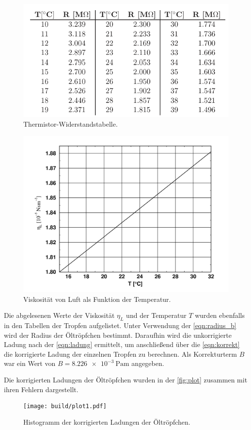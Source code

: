 \begin{figure}[H]
    \centering
	\includegraphics[width=0.666\linewidth]{content/grafik/widerstand.png}
	\captionsetup{width=0.925\linewidth}
	\caption{Thermistor-Widerstandstabelle. \cite{millikan}}
	\label{fig:wider}
\end{figure}

\begin{figure}[H]
    \centering
	\includegraphics[width=0.666\linewidth]{content/grafik/graph.png}
	\captionsetup{width=0.925\linewidth}
	\caption{Viskosität von Luft als Funktion der Temperatur. \cite{millikan}}
	\label{fig:graph}
\end{figure}

Die abgelesenen Werte der Viskosität $\eta_L$ und der Temperatur $T$ wurden ebenfalls in den Tabellen der Tropfen aufgelistet.
Unter Verwendung der \autoref{eqn:radius_b} wird der Radius der Öltröpfchen bestimmt.
Daraufhin wird die unkorrigierte Ladung nach der \autoref{eqn:ladung} ermittelt, um anschließend 
über die \autoref{eqn:korrekt} die korrigierte Ladung der einzelnen Tropfen zu berechnen. Als Korrekturterm $B$ war ein
Wert von $B = \qty{8.226e-3}{\pascal\meter}$ angegeben.

Die korrigierten Ladungen der Öltröpfchen wurden in der \autoref{fig:plot} zusammen mit ihren Fehlern dargestellt.

\begin{figure}[H]
    \centering
    \texttt{[image: build/plot1.pdf]}
    \caption{Histogramm der korrigierten Ladungen der Öltröpfchen.}
    \label{fig:plot}
\end{figure}

